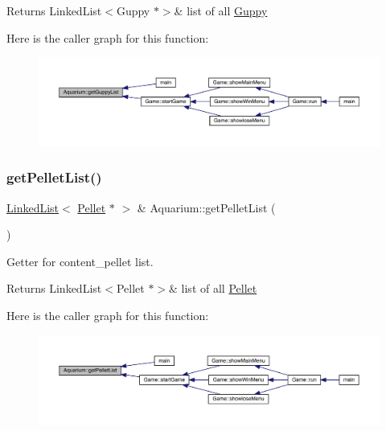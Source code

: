 \begin{DoxyReturn}{Returns}
Linked\+List$<$\+Guppy $\ast$$>$\& list of all \mbox{\hyperlink{class_guppy}{Guppy}} 
\end{DoxyReturn}
Here is the caller graph for this function\+:
\nopagebreak
\begin{figure}[H]
\begin{center}
\leavevmode
\includegraphics[width=350pt]{class_aquarium_a3244b33f404c2887f04342754f17f4ee_icgraph}
\end{center}
\end{figure}
\mbox{\label{class_aquarium_a2d0eeed1f5776e13f0bbafc6844ce7a2}} 
\subsubsection{\texorpdfstring{get\+Pellet\+List()}{getPelletList()}}
{\footnotesize\ttfamily \mbox{\hyperlink{class_linked_list}{Linked\+List}}$<$ \mbox{\hyperlink{class_pellet}{Pellet}} $\ast$ $>$ \& Aquarium\+::get\+Pellet\+List (\begin{DoxyParamCaption}{ }\end{DoxyParamCaption})}



Getter for content\+\_\+pellet list. 

\begin{DoxyReturn}{Returns}
Linked\+List$<$\+Pellet $\ast$$>$\& list of all \mbox{\hyperlink{class_pellet}{Pellet}} 
\end{DoxyReturn}
Here is the caller graph for this function\+:
\nopagebreak
\begin{figure}[H]
\begin{center}
\leavevmode
\includegraphics[width=350pt]{class_aquarium_a2d0eeed1f5776e13f0bbafc6844ce7a2_icgraph}
\end{center}
\end{figure}
\mbox{\label{class_aquarium_a46c1697b25884c5a91f7a942ae5b3ba7}} 
